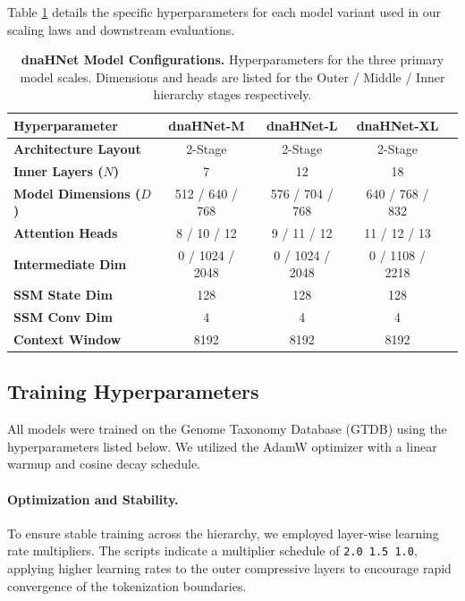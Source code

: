 \documentclass{article}
\theoremstyle{plain}
\theoremstyle{definition}
\theoremstyle{remark}
\begin{document}
Table \ref{tab:model_configs} details the specific hyperparameters for each model variant used in our scaling laws and downstream evaluations.

\begin{table}[h]
\centering
\caption{\textbf{dnaHNet Model Configurations.} Hyperparameters for the three primary model scales. Dimensions and heads are listed for the Outer / Middle / Inner hierarchy stages respectively.}
\label{tab:model_configs}
\begin{small}
\begin{tabular}{lcccc}
\toprule
\textbf{Hyperparameter} & \textbf{dnaHNet-M} & \textbf{dnaHNet-L} & \textbf{dnaHNet-XL} \\
\midrule
\textbf{Architecture Layout} & 2-Stage & 2-Stage & 2-Stage \\
\textbf{Inner Layers ($N$)} & 7 & 12 & 18 \\
\textbf{Model Dimensions ($D$)} & 512 / 640 / 768 & 576 / 704 / 768 & 640 / 768 / 832 \\
\textbf{Attention Heads} & 8 / 10 / 12 & 9 / 11 / 12 & 11 / 12 / 13 \\
\textbf{Intermediate Dim} & 0 / 1024 / 2048 & 0 / 1024 / 2048 & 0 / 1108 / 2218 \\
\textbf{SSM State Dim} & 128 & 128 & 128 \\
\textbf{SSM Conv Dim} & 4 & 4 & 4 \\
\textbf{Context Window} & 8192 & 8192 & 8192 \\
\bottomrule
\end{tabular}
\end{small}
\end{table}

\subsection{Training Hyperparameters}
\label{app:training_params}

All models were trained on the Genome Taxonomy Database (GTDB) using the hyperparameters listed below. We utilized the AdamW optimizer with a linear warmup and cosine decay schedule.

\paragraph{Optimization and Stability.}
To ensure stable training across the hierarchy, we employed layer-wise learning rate multipliers. The scripts indicate a multiplier schedule of \texttt{2.0 1.5 1.0}, applying higher learning rates to the outer compressive layers to encourage rapid convergence of the tokenization boundaries.
\end{document}
